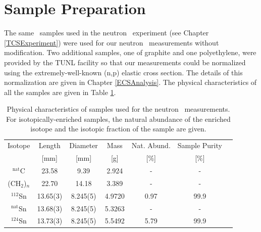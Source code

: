 \section{Sample Preparation}
The same \snTwelveNatFour\ samples used in the neutron \tot\ experiment (see Chapter
\ref{TCSExperiment}) were used for our neutron
\el\ measurements without modification. Two additional samples, one of graphite and one
polyethylene, were provided by the TUNL facility so that our measurements could
be normalized using the extremely-well-known (n,p) elastic cross section. The
details of this normalization are given in Chapter \ref{ECSAnalysis}.
The physical characteristics of all the samples are given in Table \ref{ECSSampleTable}.

\begin{table}[ht]
    \caption[Physical characteristics of samples used for neutron \el\
    measurements]
    {
        Physical characteristics of samples used for the neutron \el\
        measurements. For isotopically-enriched samples, the natural abundance
        of the enriched isotope and the isotopic fraction of the sample are
        given.
    }
    \label{ECSSampleTable}
    \begin{center}
        \begin{tabular}{ c c c c c c c }
            \hline
            Isotope & Length & Diameter
            & Mass & Nat. Abund. & Sample Purity\\
                 & [mm] & [mm] & [g] & [\%] & [\%]\\
            \hline

            $^{\text{nat}}$C & 23.58 & 9.39 & 2.924 & - & -\\
            (CH$_{2}$)$_{n}$ & 22.70 & 14.18 & 3.389 & - & -\\

            $^{112}$Sn & 13.65(3) & 8.245(5) &
            4.9720 & 0.97 & 99.9\\
            $^{\text{nat}}$Sn & 13.68(3) & 8.245(5) &
            5.3263 & - & -\\
            $^{124}$Sn & 13.73(3) & 8.245(5) &
            5.5492 & 5.79 & 99.9\\

            \hline
        \end{tabular}
    \end{center}
\end{table}

